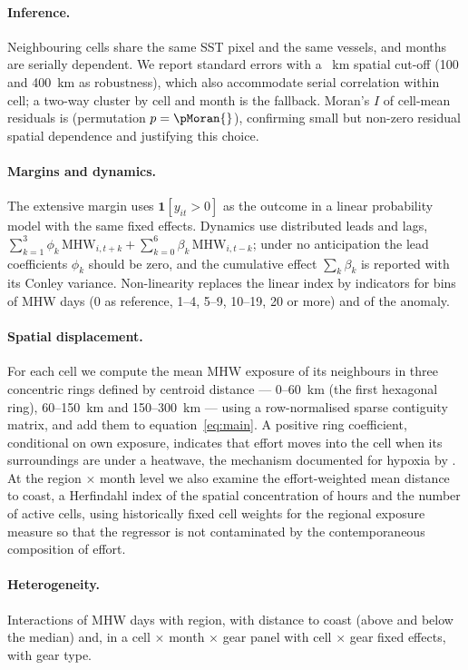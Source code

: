 \documentclass[12pt,a4paper]{article}
\begin{document}
\paragraph{Inference.} Neighbouring cells share the same SST pixel and the same vessels, and months are serially dependent. We report \citet{conley1999} standard errors with a \conleyCutoff{}~km spatial cut-off (100 and 400~km as robustness), which also accommodate serial correlation within cell; a two-way cluster by cell and month is the fallback. Moran's $I$ of cell-mean residuals is \moranI{} (permutation $p=\pMoran{}$), confirming small but non-zero residual spatial dependence and justifying this choice.

\paragraph{Margins and dynamics.} The extensive margin uses $\mathbf{1}[y_{it}>0]$ as the outcome in a linear probability model with the same fixed effects. Dynamics use distributed leads and lags, $\sum_{k=1}^{3}\phi_k\,\mathrm{MHW}_{i,t+k} + \sum_{k=0}^{6}\beta_k\,\mathrm{MHW}_{i,t-k}$; under no anticipation the lead coefficients $\phi_k$ should be zero, and the cumulative effect $\sum_k\beta_k$ is reported with its Conley variance. Non-linearity replaces the linear index by indicators for bins of MHW days (0 as reference, 1--4, 5--9, 10--19, 20 or more) and of the anomaly.

\paragraph{Spatial displacement.} For each cell we compute the mean MHW exposure of its neighbours in three concentric rings defined by centroid distance --- 0--60~km (the first hexagonal ring), 60--150~km and 150--300~km --- using a row-normalised sparse contiguity matrix, and add them to equation~\eqref{eq:main}. A positive ring coefficient, conditional on own exposure, indicates that effort moves into the cell when its surroundings are under a heatwave, the mechanism documented for hypoxia by \citet{smith2014}. At the region $\times$ month level we also examine the effort-weighted mean distance to coast, a Herfindahl index of the spatial concentration of hours and the number of active cells, using historically fixed cell weights for the regional exposure measure so that the regressor is not contaminated by the contemporaneous composition of effort.

\paragraph{Heterogeneity.} Interactions of MHW days with region, with distance to coast (above and below the median) and, in a cell $\times$ month $\times$ gear panel with cell $\times$ gear fixed effects, with gear type.
\end{document}
